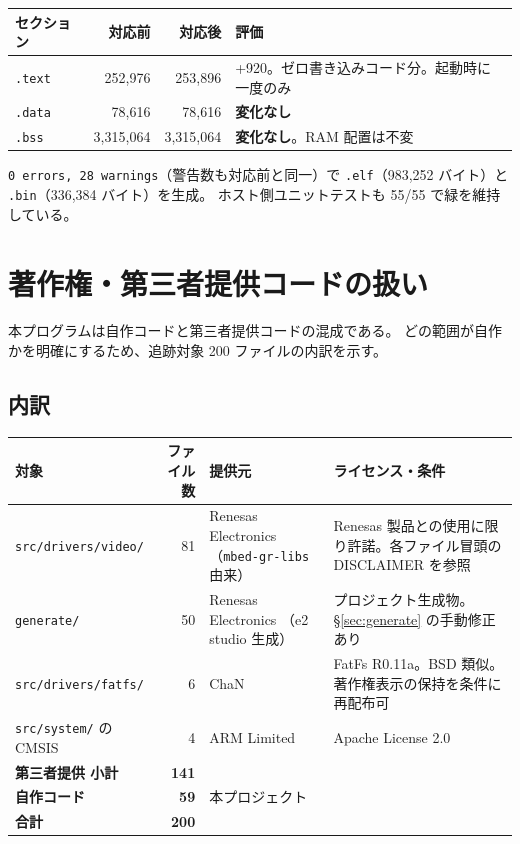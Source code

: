 \documentclass[a4paper,11pt,dvipdfmx]{jsarticle}
\begin{document}
\begin{tabularx}{\textwidth}{l r r X}
\toprule
\textbf{セクション} & \textbf{対応前} & \textbf{対応後} & \textbf{評価} \\
\midrule
\texttt{.text} & 252{,}976 & 253{,}896 & +920。ゼロ書き込みコード分。起動時に一度のみ \\
\texttt{.data} & 78{,}616 & 78{,}616 & \textbf{変化なし} \\
\texttt{.bss}  & 3{,}315{,}064 & 3{,}315{,}064 & \textbf{変化なし}。RAM 配置は不変 \\
\bottomrule
\end{tabularx}

\vspace{2mm}
\texttt{0 errors, 28 warnings}（警告数も対応前と同一）で
\texttt{.elf}（983{,}252 バイト）と \texttt{.bin}（336{,}384 バイト）を生成。
ホスト側ユニットテストも 55/55 で緑を維持している。

\section{著作権・第三者提供コードの扱い}\label{sec:license}

本プログラムは自作コードと第三者提供コードの混成である。
どの範囲が自作かを明確にするため、追跡対象 200 ファイルの内訳を示す。

\subsection{内訳}

\begin{tabularx}{\textwidth}{l r l X}
\toprule
\textbf{対象} & \textbf{ファイル数} & \textbf{提供元} & \textbf{ライセンス・条件} \\
\midrule
\texttt{src/drivers/video/} & 81 & Renesas Electronics
  （\texttt{mbed-gr-libs} 由来） & Renesas 製品との使用に限り許諾。各ファイル冒頭の
  DISCLAIMER を参照 \\
\texttt{generate/} & 50 & Renesas Electronics
  （e2 studio 生成） & プロジェクト生成物。\hyperref[sec:generate]{§\ref*{sec:generate}} の手動修正あり \\
\texttt{src/drivers/fatfs/} & 6 & ChaN & FatFs R0.11a。BSD 類似。
  著作権表示の保持を条件に再配布可 \\
\texttt{src/system/} の CMSIS & 4 & ARM Limited & Apache License 2.0 \\
\midrule
\textbf{第三者提供 小計} & \textbf{141} & & \\
\textbf{自作コード} & \textbf{59} & 本プロジェクト & \\
\midrule
\textbf{合計} & \textbf{200} & & \\
\bottomrule
\end{tabularx}
\end{document}
